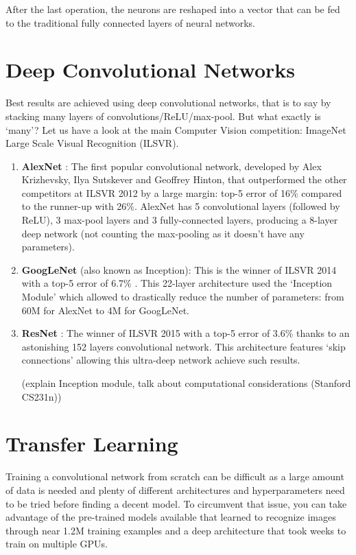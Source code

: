 After the last operation, the neurons are reshaped into a vector that can be fed to the traditional fully connected layers of neural networks.

\section{Deep Convolutional Networks}
Best results are achieved using deep convolutional networks, that is to say by stacking many layers of convolutions/ReLU/max-pool. But what exactly is `many'? Let us have a look at the main Computer Vision competition: ImageNet Large Scale Visual Recognition (ILSVR).
\begin{enumerate}
    \item \textbf{AlexNet} \cite{alexnet}: The first popular convolutional network, developed by Alex Krizhevsky, Ilya Sutskever and Geoffrey Hinton, that outperformed 
    the other competitors at ILSVR 2012 by a large margin: top-5 error of 16\% compared to the runner-up with 26\%. AlexNet has 5 convolutional layers (followed by 
    ReLU), 3 max-pool layers and 3 fully-connected layers, producing a 8-layer deep network (not counting the max-pooling as it doesn't have any parameters).
    \item \textbf{GoogLeNet} (also known as Inception)\cite{googlenet}: This is the winner of ILSVR 2014 with a top-5 error of 6.7\% . This 22-layer architecture used 
    the `Inception Module' which allowed to drastically reduce the number of parameters: from 60M for AlexNet to 4M for GoogLeNet.
    \item \textbf{ResNet} \cite{resnet}: The winner of ILSVR 2015 with a top-5 error of 3.6\% thanks to an astonishing 152 layers convolutional network. This 
    architecture features `skip connections' allowing this ultra-deep network achieve such results.

(explain Inception module, talk about computational considerations (Stanford CS231n))
\end{enumerate}

\section{Transfer Learning}
Training a convolutional network from scratch can be difficult as a large amount of data is needed and plenty of different architectures and hyperparameters need to be tried before finding a decent model. To circumvent that issue, you can take advantage of the pre-trained models available that learned to recognize images through near 1.2M training examples and a deep architecture that took weeks to train on multiple GPUs.


